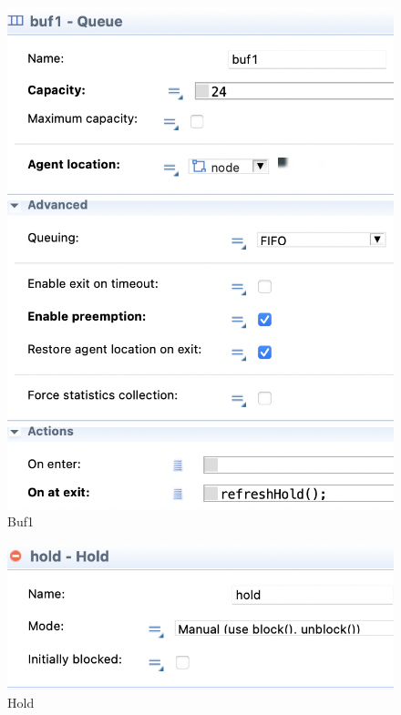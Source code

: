 \documentclass[14pt, a4paper, titlepage]{extarticle}
\begin{document}
	\begin{figure}[H]
		\centering
		\includegraphics[width=.9\textwidth]{buf1}
		\caption{Buf1}
	\end{figure}

	\begin{figure}[H]
		\centering
		\includegraphics[width=.9\textwidth]{hold}
		\caption{Hold}
	\end{figure}
\end{document}
